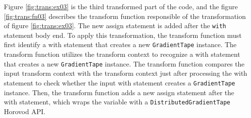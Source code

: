 Figure \ref{fig:trans:ex03} is the third transformed part of the code, and
the figure \ref{fig:trans:fn03} describes the transform function responsible 
of the transformation of figure \ref{fig:trans:ex03}.
The new assign statement is added after the {\tt with} statement body end.
To apply this transformation, the transform function must first identify
a with statement that creates a new {\tt GradientTape} instance. 
The transform function utilizes the transform context to recognize a
with statement that creates a new {\tt GradientTape} instance. 
The transform function compares the input transform context with the 
transform context just after processing the with statement to check
whether the input with statement creates a {\tt GradientTape} instance.
Then, the transform function adds a new assign statement after the 
with statement, which wraps the variable with a
{\tt DistributedGradientTape} Horovod API.


